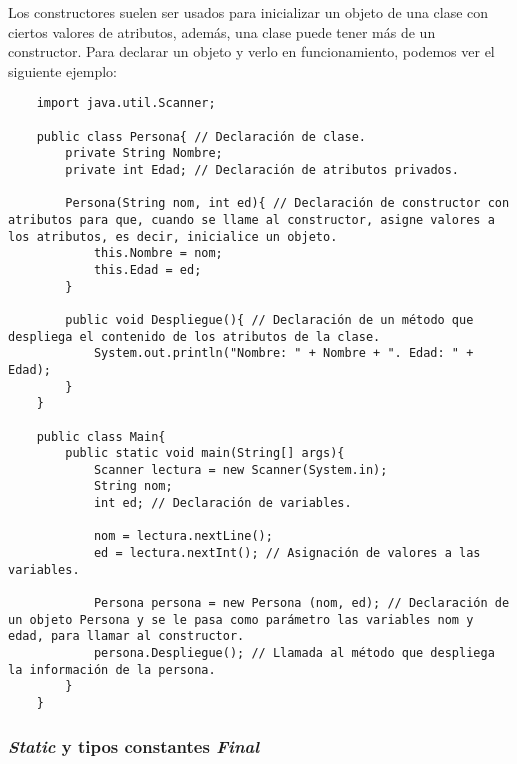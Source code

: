 Los constructores suelen ser usados para inicializar un objeto de una clase con ciertos valores de atributos, además, una clase puede tener más de un constructor. Para declarar un objeto y verlo en funcionamiento, podemos ver el siguiente ejemplo:
\begin{lstlisting}
    import java.util.Scanner;
    
    public class Persona{ // Declaración de clase.
        private String Nombre;
        private int Edad; // Declaración de atributos privados.
        
        Persona(String nom, int ed){ // Declaración de constructor con atributos para que, cuando se llame al constructor, asigne valores a los atributos, es decir, inicialice un objeto.
            this.Nombre = nom;
            this.Edad = ed;
        }
        
        public void Despliegue(){ // Declaración de un método que despliega el contenido de los atributos de la clase.
            System.out.println("Nombre: " + Nombre + ". Edad: " + Edad);
        }
    }
    
    public class Main{
        public static void main(String[] args){
            Scanner lectura = new Scanner(System.in);
            String nom;
            int ed; // Declaración de variables.
            
            nom = lectura.nextLine();
            ed = lectura.nextInt(); // Asignación de valores a las variables.
            
            Persona persona = new Persona (nom, ed); // Declaración de un objeto Persona y se le pasa como parámetro las variables nom y edad, para llamar al constructor.
            persona.Despliegue(); // Llamada al método que despliega la información de la persona.
        }
    }
\end{lstlisting}


\subsubsection{\textit{Static} y tipos constantes \textit{Final}}

